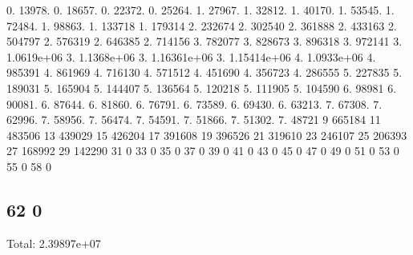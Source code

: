 0. 13978. 0. 18657. 0. 22372. 0. 25264. 1. 27967. 1. 32812. 1. 40170. 1. 53545. 1. 72484. 1. 98863. 1. 133718 1. 179314 2. 232674 2. 302540 2. 361888 2. 433163 2. 504797 2. 576319 2. 646385 2. 714156 3. 782077 3. 828673 3. 896318 3. 972141 3. 1.\+0619e+06 3. 1.\+1368e+06 3. 1.\+16361e+06 3. 1.\+15414e+06 4. 1.\+0933e+06 4. 985391 4. 861969 4. 716130 4. 571512 4. 451690 4. 356723 4. 286555 5. 227835 5. 189031 5. 165904 5. 144407 5. 136564 5. 120218 5. 111905 5. 104590 6. 98981 6. 90081. 6. 87644. 6. 81860. 6. 76791. 6. 73589. 6. 69430. 6. 63213. 7. 67308. 7. 62996. 7. 58956. 7. 56474. 7. 54591. 7. 51866. 7. 51302. 7. 48721 9 665184 11 483506 13 439029 15 426204 17 391608 19 396526 21 319610 23 246107 25 206393 27 168992 29 142290 31 0 33 0 35 0 37 0 39 0 41 0 43 0 45 0 47 0 49 0 51 0 53 0 55 0 58 0 \subsection*{62 0 }

Total\+: 2.\+39897e+07 